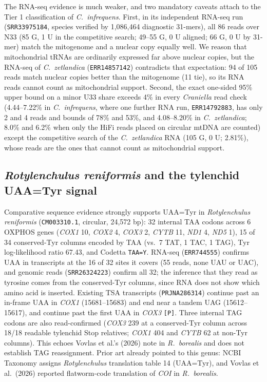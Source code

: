 \documentclass[11pt, a4paper]{article}
\begin{document}
The RNA-seq evidence is much weaker, and two mandatory caveats attach to the Tier 1 classification of \textit{C.\ infrequens}. First, in its independent RNA-seq run (\texttt{SRR33975184}, species verified by 1,086,464 diagnostic 31-mers), all 86 reads over N33 (85 G, 1 U in the competitive search; 49--55 G, 0 U aligned; 66 G, 0 U by 31-mer) match the mitogenome and a nuclear copy equally well. We reason that mitochondrial tRNAs are ordinarily expressed far above nuclear copies, but the RNA-seq of \textit{C.\ zetlandica} (\texttt{ERR14857142}) contradicts that expectation: 94 of 105 reads match nuclear copies better than the mitogenome (11 tie), so its RNA reads cannot count as mitochondrial support. Second, the exact one-sided 95\% upper bound on a minor U33 share exceeds 4\% in every \textit{Craniella} read check (4.44--7.22\% in \textit{C.\ infrequens}, where one further RNA run, \texttt{ERR14792883}, has only 2 and 4 reads and bounds of 78\% and 53\%, and 4.08--8.20\% in \textit{C.\ zetlandica}; 8.0\% and 6.2\% when only the HiFi reads placed on circular mtDNA are counted) except the competitive search of the \textit{C.\ zetlandica} RNA (105 G, 0 U; 2.81\%), whose reads are the ones that cannot count as mitochondrial support.

\subsection{\textit{Rotylenchulus reniformis} and the tylenchid UAA=Tyr signal}
Comparative sequence evidence strongly supports UAA=Tyr in \textit{Rotylenchulus reniformis} (\texttt{CM003310.1}, circular, 24,572 bp): 32 internal TAA codons across 6 OXPHOS genes (\textit{COX1} 10, \textit{COX2} 4, \textit{COX3} 2, \textit{CYTB} 11, \textit{ND1} 4, \textit{ND5} 1), 15 of 34 conserved-Tyr columns encoded by TAA (vs.\ 7 TAT, 1 TAC, 1 TAG), Tyr log-likelihood ratio 67.43, and Codetta \texttt{TAA=Y}. RNA-seq (\texttt{ERR744555}) confirms UAA in transcripts at the 16 of 32 sites it covers (55 reads, none UAU or UAC), and genomic reads (\texttt{SRR26324223}) confirm all 32; the inference that they read as tyrosine comes from the conserved-Tyr columns, since RNA does not show which amino acid is inserted. Existing TSA transcripts (\texttt{PRJNA286314}) continue past an in-frame UAA in \textit{COX1} (15681--15683) and end near a tandem UAG (15612--15617), and continue past the first UAA in \textit{COX3} \texttt{[P]}. Three internal TAG codons are also read-confirmed (\textit{COX3} 239 at a conserved-Tyr column across 18/18 readable tylenchid Stop relatives; \textit{COX1} 404 and \textit{CYTB} 62 at non-Tyr columns). This echoes Vovlas et al.'s (2026) note in \textit{R.\ borealis} and does not establish TAG reassignment. Prior art already pointed to this genus: NCBI Taxonomy assigns \textit{Rotylenchulus} translation table 14 (UAA=Tyr), and Vovlas et al.\ (2026) reported flatworm-code translation of \textit{COI} in \textit{R.\ borealis}.
\end{document}
